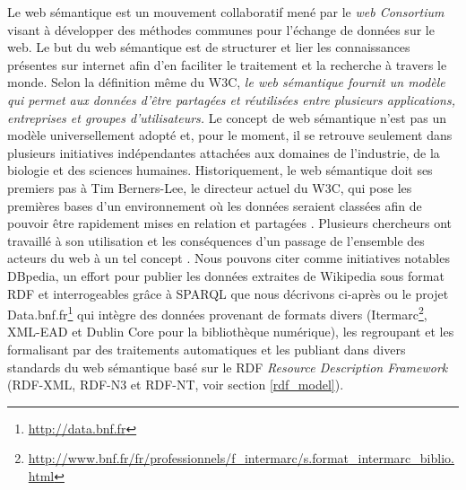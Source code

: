 Le web sémantique est un mouvement collaboratif mené par le \textit{web Consortium} visant à développer des méthodes communes pour l'échange de données sur le web. Le but du web sémantique est de structurer et lier les connaissances présentes sur internet afin d'en faciliter le traitement et la recherche à travers le monde. Selon la définition même du W3C, \textit{le web sémantique fournit un modèle qui permet aux données d'être partagées et réutilisées entre plusieurs applications, entreprises et groupes d'utilisateurs.} Le concept de web sémantique n'est pas un modèle universellement adopté et, pour le moment, il se retrouve seulement dans plusieurs initiatives indépendantes attachées aux domaines de l'industrie, de la biologie et des sciences humaines. Historiquement, le web sémantique doit ses premiers pas à Tim Berners-Lee, le directeur actuel du W3C, qui pose les premières bases d'un environnement où les données seraient classées afin de pouvoir être rapidement mises en relation et partagées \cite{berners2001semantic}. Plusieurs chercheurs ont travaillé à son utilisation et les conséquences d'un passage de l'ensemble des acteurs du web à un tel concept \cite{feigenbaum_semantic_2007}. Nous pouvons citer comme initiatives notables DBpedia, un effort pour publier les données extraites de Wikipedia sous format RDF et interrogeables grâce à SPARQL que nous décrivons ci-après \cite{auer2007dbpedia} ou le projet Data.bnf.fr\footnote{\url{http://data.bnf.fr}} qui intègre des données provenant de formats divers (Itermarc\footnote{\url{http://www.bnf.fr/fr/professionnels/f_intermarc/s.format_intermarc_biblio.html}}, XML-EAD et Dublin Core \cite{weibel1998dublin} pour la bibliothèque numérique), les regroupant et les formalisant par des traitements automatiques et les publiant dans divers standards du web sémantique basé sur le RDF \textit{Resource Description Framework} (RDF-XML, RDF-N3 et RDF-NT, voir section \ref{rdf_model}).

